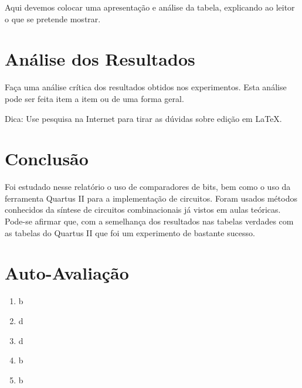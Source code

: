\documentclass[12pt]{article}
\begin{document}
Aqui devemos colocar uma apresentação e análise da tabela, explicando ao leitor o que se pretende mostrar.

\section{Análise dos Resultados}
\label{sec:Resultados}

Faça uma análise crítica dos resultados obtidos nos experimentos. Esta análise pode ser feita item a item ou de uma forma geral.

Dica: Use pesquisa na Internet para tirar as dúvidas sobre edição em \LaTeX .

\section{Conclusão}
\label{sec:Conclusao}
Foi estudado nesse relatório o uso de comparadores de bits, bem como o uso da
ferramenta Quartus II para a implementação de circuitos. Foram usados métodos
conhecidos da síntese de circuitos combinacionais já vistos em aulas teóricas.
Pode-se afirmar que, com a semelhança dos resultados nas tabelas verdades com
as tabelas do Quartus II que foi um experimento de bastante sucesso.
\newpage 
\section*{Auto-Avaliação}

\begin{enumerate}
    \item b
    \item d
    \item d
    \item b
    \item b
\end{enumerate}
\end{document}
